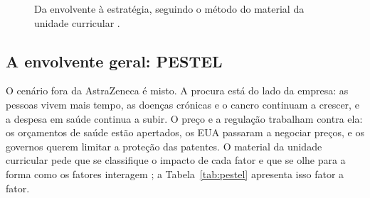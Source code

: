 \begin{figure}[H]\centering
{}
\caption{Da envolvente à estratégia, seguindo o método do material da unidade curricular \cite[pp.~17--29]{PLAN}.}
\label{fig:metodo}
\end{figure}
\subsection{A envolvente geral: PESTEL}
O cenário fora da AstraZeneca é misto. A procura está do lado da empresa: as pessoas vivem mais tempo, as doenças crónicas e o cancro continuam a crescer, e a despesa em saúde continua a subir. O preço e a regulação trabalham contra ela: os orçamentos de saúde estão apertados, os EUA passaram a negociar preços, e os governos querem limitar a proteção das patentes. O material da unidade curricular pede que se classifique o impacto de cada fator e que se olhe para a forma como os fatores interagem \cite[p.~19]{PLAN}; a Tabela~\ref{tab:pestel} apresenta isso fator a fator.


